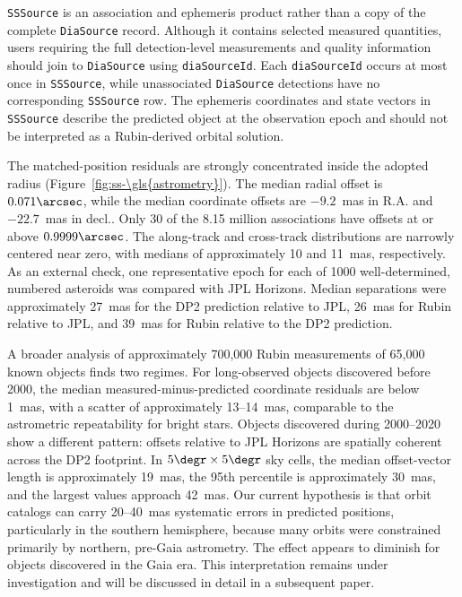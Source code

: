 \texttt{SSSource} is an association and \gls{ephemeris} product rather than a copy
of the complete \texttt{DiaSource} record.  Although it contains selected
measured quantities, users requiring the full detection-level measurements
and quality information should join to \texttt{DiaSource} using
\texttt{diaSourceId}.  Each \texttt{diaSourceId} occurs at most once in
\texttt{SSSource}, while unassociated \texttt{DiaSource} detections have no
corresponding \texttt{SSSource} row.  The \gls{ephemeris} coordinates and state
vectors in \texttt{SSSource} describe the predicted object at the observation
\gls{epoch} and should not be interpreted as a Rubin-derived orbital solution.

The matched-position residuals are strongly concentrated inside the adopted
radius (Figure~\ref{fig:ss-\gls{astrometry}}).  The median radial offset is
$0.071\arcsec$, while the median coordinate offsets are $-9.2$~mas in R.A.
and $-22.7$~mas in decl..  Only 30 of the 8.15 million associations have
offsets at or above $0.9999\arcsec$.  The along-track and cross-track
distributions are narrowly centered near zero, with medians of approximately
10 and 11~mas, respectively.  As an external check, one representative \gls{epoch}
for each of 1000 well-determined, numbered asteroids was compared with \gls{JPL}
Horizons.  Median separations were approximately 27~mas for the \gls{DP2} prediction
relative to \gls{JPL}, 26~mas for Rubin relative to \gls{JPL}, and 39~mas for Rubin
relative to the \gls{DP2} prediction.

A broader analysis of approximately 700,000 Rubin measurements of 65,000
known objects finds two regimes.  For long-observed objects discovered before
2000, the median measured-minus-predicted coordinate residuals are below
1~mas, with a scatter of approximately 13--14~mas, comparable to the
astrometric repeatability for bright stars.  Objects discovered during
2000--2020 show a different pattern: offsets relative to \gls{JPL} Horizons are
spatially coherent across the \gls{DP2} footprint.  In $5\degr\times5\degr$ sky
cells, the median offset-vector length is approximately 19~mas, the 95th
percentile is approximately 30~mas, and the largest values approach 42~mas.
Our current hypothesis is that orbit catalogs can carry 20--40~mas systematic
errors in predicted positions, particularly in the southern hemisphere,
because many orbits were constrained primarily by northern, pre-\gls{Gaia}
\gls{astrometry}.  The effect appears to diminish for objects discovered in the
\gls{Gaia} era.  This interpretation remains under investigation and will be
discussed in detail in a subsequent paper.


